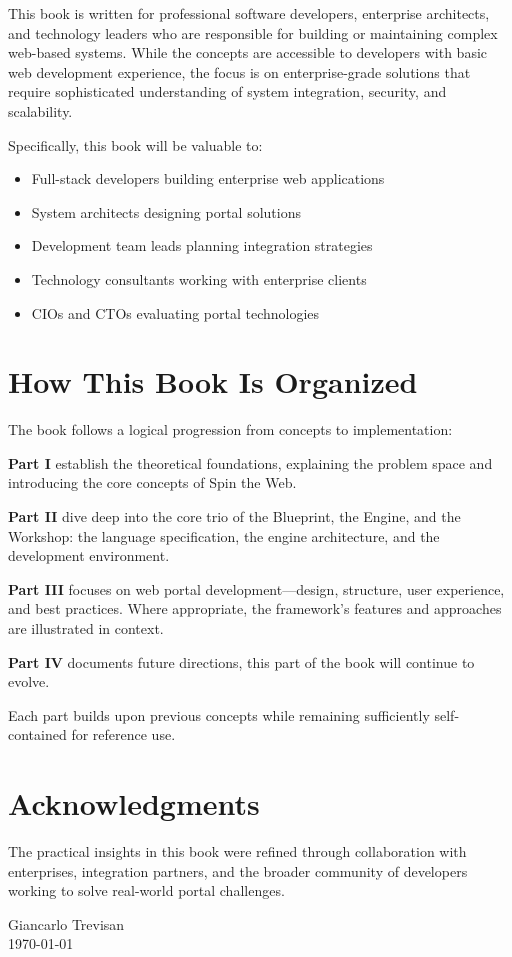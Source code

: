 This book is written for professional software developers, enterprise architects, and technology leaders who are responsible for building or maintaining complex web-based systems. While the concepts are accessible to developers with basic web development experience, the focus is on enterprise-grade solutions that require sophisticated understanding of system integration, security, and scalability.

Specifically, this book will be valuable to:
\begin{itemize}
\item Full-stack developers building enterprise web applications
\item System architects designing portal solutions
\item Development team leads planning integration strategies
\item Technology consultants working with enterprise clients
\item CIOs and CTOs evaluating portal technologies
\end{itemize}

\section*{How This Book Is Organized}

The book follows a logical progression from concepts to implementation:

\textbf{Part I} establish the theoretical foundations, explaining the problem space and introducing the core concepts of Spin the Web.

\textbf{Part II} dive deep into the core trio of the Blueprint, the Engine, and the Workshop: the \wbdl language specification, the \webspinner engine architecture, and the \studio development environment.

\textbf{Part III} focuses on web portal development—design, structure, user experience, and best practices. Where appropriate, the framework’s features and approaches are illustrated in context.

\textbf{Part IV} documents future directions, this part of the book will continue to evolve.

Each part builds upon previous concepts while remaining sufficiently self-contained for reference use.

\section*{Acknowledgments}

The practical insights in this book were refined through collaboration with enterprises, integration partners, and the broader community of developers working to solve real-world portal challenges.

\vspace{1cm}
\hfill Giancarlo Trevisan \\
\hfill \today

\clearpage
